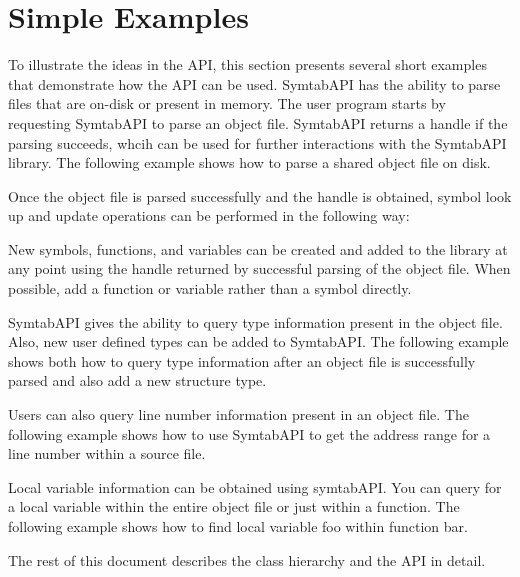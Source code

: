 \section{Simple Examples}

To illustrate the ideas in the API, this section presents several short examples
that demonstrate how the API can be used.  SymtabAPI has the ability to parse
files that are on-disk or present in memory. The user program starts by
requesting SymtabAPI to parse an object file. SymtabAPI returns a handle if the
parsing succeeds, whcih can be used for further interactions with the SymtabAPI
library. The following example shows how to parse a shared object file on disk.



Once the object file is parsed successfully and the handle is obtained, symbol look up and update operations can be performed in the following way:



\newpage

New symbols, functions, and variables can be created and added to the library at any point using the handle returned by successful parsing of the object file. When possible, add a function or variable rather than a symbol directly.



SymtabAPI gives the ability to query type information present in the object file. Also, new user defined types can be added to SymtabAPI. The following example shows both how to query type information after an object file is successfully parsed and also add a new structure type.



Users can also query line number information present in an object file. The following example shows how to use SymtabAPI to get the address range for a line number within a source file.



Local variable information can be obtained using symtabAPI. You can query for a local variable within the entire object file or just within a function. The following example shows how to find local variable foo within function bar.



The rest of this document describes the class hierarchy and the API in detail.
